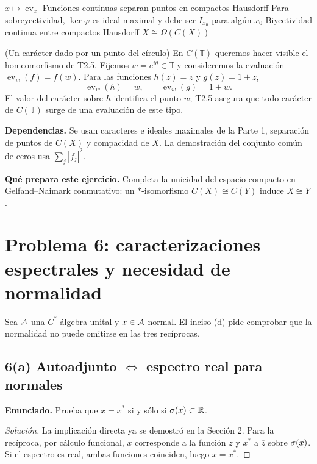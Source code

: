 \proofdiagrambranch
{$x\mapsto\operatorname{ev}_x$}
{Funciones continuas separan puntos en compactos Hausdorff}
{Para sobreyectividad, $\ker\varphi$ es ideal maximal y debe ser $I_{x_0}$ para algún $x_0$}
{Biyectividad continua entre compactos Hausdorff}
{$X\cong\Omega(C(X))$}

\begin{cthejemplo}{(Un carácter dado por un punto del círculo)}
En $C(\mathbb T)$ queremos hacer visible el homeomorfismo de T2.5.
Fijemos $w=e^{i\theta}\in\mathbb T$ y consideremos la evaluación
$\operatorname{ev}_w(f)=f(w)$. Para las funciones $h(z)=z$ y $g(z)=1+z$,
\[
 \operatorname{ev}_w(h)=w,\qquad \operatorname{ev}_w(g)=1+w.
\]
El valor del carácter sobre $h$ identifica el punto $w$; T2.5 asegura que todo carácter de
$C(\mathbb T)$ surge de una evaluación de este tipo.
\end{cthejemplo}

\noindent\textbf{Dependencias.} Se usan caracteres e ideales maximales de la Parte 1, separación de puntos de $C(X)$ y compacidad de $X$. La demostración del conjunto común de ceros usa $\sum_j|f_j|^2$.

\noindent\textbf{Qué prepara este ejercicio.} Completa la unicidad del espacio compacto en Gelfand--Naimark conmutativo: un $*$-isomorfismo $C(X)\cong C(Y)$ induce $X\cong Y$.

\section{Problema 6: caracterizaciones espectrales y necesidad de normalidad}

Sea $\mathcal A$ una $C^*$-álgebra unital y $x\in\mathcal A$ normal. El inciso (d) pide comprobar que la
normalidad no puede omitirse en las tres recíprocas.

\subsection*{6(a) Autoadjunto $\Longleftrightarrow$ espectro real para normales}

\noindent\textbf{Enunciado.} Prueba que $x=x^*$ si y sólo si $\sigma(x)\subset\mathbb R$.

\begin{proof}[Solución]
La implicación directa ya se demostró en la Sección 2. Para la recíproca, por cálculo funcional,
$x$ corresponde a la función $z$ y $x^*$ a $\overline z$ sobre $\sigma(x)$. Si el espectro es real,
ambas funciones coinciden, luego $x=x^*$.
\end{proof}

